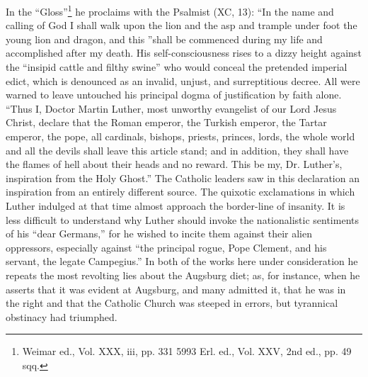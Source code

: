 In the “Gloss”\footnote{Weimar ed., Vol. XXX, iii, pp. 331 5993 Erl. ed., Vol. XXV, 2nd ed., pp. 49 sqq.}
he proclaims with the Psalmist (XC, 13): “In
the name and calling of God I shall walk upon the lion and the asp
and trample under foot the young lion and dragon, and this ”shall
be commenced during my life and accomplished after my death. His
self-consciousness rises to a dizzy height against the “insipid cattle
and filthy swine” who would conceal the pretended imperial edict,
which is denounced as an invalid, unjust, and surreptitious decree.
All were warned to leave untouched his principal dogma of justification
by faith alone. “Thus I, Doctor Martin Luther, most unworthy
evangelist of our Lord Jesus Christ, declare that the Roman emperor,
the Turkish emperor, the Tartar emperor, the pope, all cardinals,
bishops, priests, princes, lords, the whole world and all the devils shall
leave this article stand; and in addition, they shall have the flames of
hell about their heads and no reward. This be my, Dr. Luther’s, inspiration
from the Holy Ghost.” The Catholic leaders saw in this
declaration an inspiration from an entirely different source. The
quixotic exclamations in which Luther indulged at that time almost
approach the border-line of insanity. It is less difficult to understand
why Luther should invoke the nationalistic sentiments of his “dear
Germans,” for he wished to incite them against their alien oppressors,
especially against “the principal rogue, Pope Clement, and his
servant, the legate Campegius.” In both of the works here under
consideration he repeats the most revolting lies about the Augsburg
diet; as, for instance, when he asserts that it was evident at Augsburg,
and many admitted it, that he was in the right and that the
Catholic Church was steeped in errors, but tyrannical obstinacy had
triumphed.

